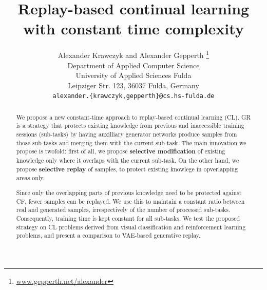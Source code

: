 \documentclass{article} %
\title{Replay-based continual learning with constant time complexity}
\author{Alexander Krawczyk and Alexander Gepperth \thanks{\url{www.gepperth.net/alexander}} \\
Department of Applied Computer Science\\
University of Applied Sciences Fulda\\
Leipziger Str. 123, 36037 Fulda, Germany \\
\texttt{alexander.\{krawczyk,gepperth\}@cs.hs-fulda.de} \\
}
\begin{document}
\maketitle

\begin{abstract}
We propose a new constant-time approach to replay-based continual learning (CL). 
%
GR is a strategy that protects existing knowledge from previous and inaccessible training sessions (sub-tasks) by having auxilliary generator networks produce samples from those sub-tasks and merging them with the current sub-task.
%
The main innovation we propose is twofold: first of all, we propose \textbf{selective modification} of existing knowledge only where it overlaps with the current sub-task. On the other hand,
we propose \textbf{selective replay} of samples, to protect existing knowlege in opverlapping areas only. 

Since only the overlapping parts of previous knowledge need to be protected against CF, fewer samples can be replayed. We use this to  maintain a constant ratio between real and generated samples, irrespectively of the number of processed sub-tasks. Consequently, training time is kept constant for all sub-tasks.
%
We test the proposed strategy on CL problems derived from visual classification and reinforcement learning problems, and present a comparison to VAE-based generative replay.
\end{abstract}
\end{document}
